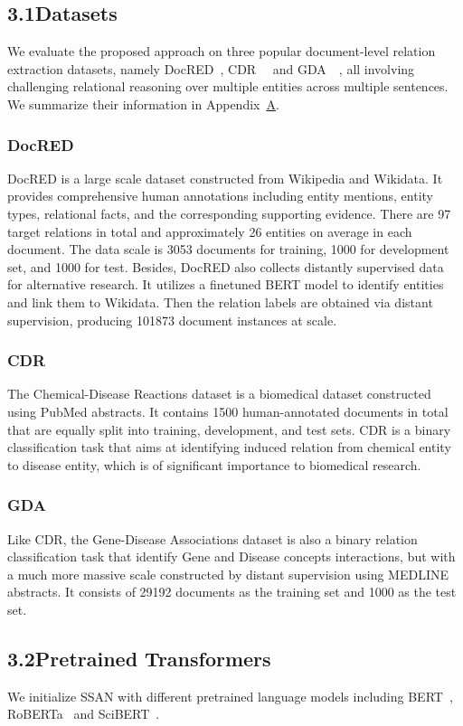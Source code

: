 \documentclass[letterpaper]{article} \usepackage{aaai21}  \usepackage{times}  \usepackage{helvet} \usepackage{courier}  \usepackage[hyphens]{url}  \usepackage{graphicx} \usepackage{booktabs}
\begin{document}
\subsection{3.1\quad Datasets}
We evaluate the proposed approach on three popular document-level relation extraction datasets, namely DocRED~\cite{yao-etal-2019-docred}, CDR~~\cite{li2016biocreative} and GDA~~\cite{wu2019renet}, all involving challenging relational reasoning over multiple entities across multiple sentences.
We summarize their information in Appendix~\hyperref[appendix:a]{A}.
\subsubsection{DocRED}
DocRED is a large scale dataset constructed from Wikipedia and Wikidata.
It provides comprehensive human annotations including entity mentions, entity types, relational facts, and the corresponding supporting evidence.
There are 97 target relations in total and approximately 26 entities on average in each document.
The data scale is 3053 documents for training, 1000 for development set, and 1000 for test.
Besides, DocRED also collects distantly supervised data for alternative research.
It utilizes a finetuned BERT model to identify entities and link them to Wikidata. Then the relation labels are obtained via distant supervision, producing 101873 document instances at scale.
\subsubsection{CDR}
The Chemical-Disease Reactions dataset is a biomedical dataset constructed using PubMed abstracts.
It contains 1500 human-annotated documents in total that are equally split into training, development, and test sets.
CDR is a binary classification task that aims at identifying induced relation from chemical entity to disease entity, which is of significant importance to biomedical research.
\subsubsection{GDA}
Like CDR, the Gene-Disease Associations dataset is also a binary relation classification task that identify Gene and Disease concepts interactions, but with a much more massive scale constructed by distant supervision using MEDLINE abstracts.
It consists of 29192 documents as the training set and 1000 as the test set.


\subsection{3.2\quad Pretrained Transformers}
We initialize SSAN with different pretrained language models including BERT~\cite{devlin-etal-2019-bert}, RoBERTa~\cite{liu2019roberta} and SciBERT~\cite{beltagy-etal-2019-scibert}.
\end{document}
